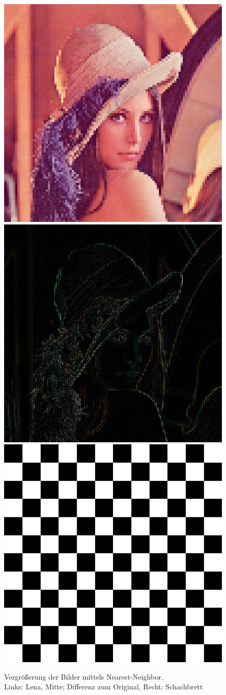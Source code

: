 \begin{figure}[p]
	\centering
	\includegraphics[width=0.24\linewidth]{img/lena100_NN}
	\includegraphics[width=0.24\linewidth]{img/lena100_NN_differenz}
	\includegraphics[width=0.24\linewidth]{img/Schachbrett_NN}
	\caption{Vergrößerung der Bilder mittels Nearest-Neighbor.\\
		Links: Lena, Mitte; Differenz zum Original, Recht: Schachbrett}
	\label{img_NN}
\end{figure}
